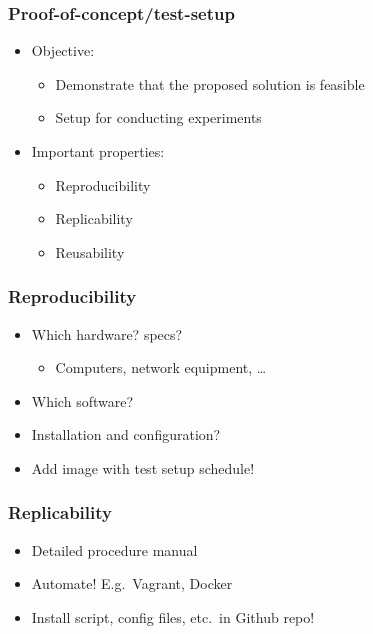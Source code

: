 \documentclass[aspectratio=169]{beamer}
\begin{document}
\begin{frame}
  \frametitle{Proof-of-concept/test-setup}

  \begin{itemize}
    \item Objective:
    \begin{itemize}
        \item Demonstrate that the proposed solution is feasible
        \item Setup for conducting experiments
    \end{itemize}
    \item Important properties:
    \begin{itemize}
        \item Reproducibility
        \item Replicability
        \item Reusability
    \end{itemize}
  \end{itemize}

\end{frame}

\begin{frame}
  \frametitle{Reproducibility}


  \bigskip

  \begin{itemize}
   \item Which hardware? specs?
   \begin{itemize}
       \item Computers, network equipment, \ldots
   \end{itemize}
   \item Which software?
   \item Installation and configuration?
   \item Add image with test setup schedule!
  \end{itemize}

\end{frame}

\begin{frame}
  \frametitle{Replicability}


  \bigskip

  \begin{itemize}
   \item Detailed procedure manual
   \item Automate! E.g.\ Vagrant, Docker
   \item Install script, config files, etc.\ in Github repo!
  \end{itemize}

\end{frame}
\end{document}
